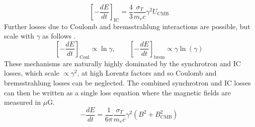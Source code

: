 \begin{equation}
    \left[-\frac{dE}{dt}\right]_{\mathrm{IC}} = \frac43\frac{\sigma_T}{m_e c} \gamma^2 U_{\mathrm{CMB}}
\end{equation}
Further losses due to Coulomb and bremsstrahlung interactions are possible, but scale with $\gamma$ as follows \citep{Sarazin1999}.
\begin{equation*}
    \left[-\frac{dE}{dt}\right]_{\mathrm{Coul}} \propto \ln\gamma, \qquad \left[-\frac{dE}{dt}\right]_{\mathrm{brem}} \propto \gamma\ln(\gamma)
\end{equation*}
These mechanisms are naturally highly dominated by the synchrotron and IC losses, which scale $\propto \gamma^2$, at high Lorentz factors and so Coulomb and bremsstrahlung losses can be neglected. The combined synchrotron and IC losses can then be written as a single loss equation where the magnetic fields are measured in $\mu$G.
\begin{equation}
    -\frac{dE}{dt} = \frac1{6\pi}\frac{\sigma_T}{m_e c} \gamma^2\left(B^2 + B_{\mathrm{CMB}}^2\right)
\end{equation}

